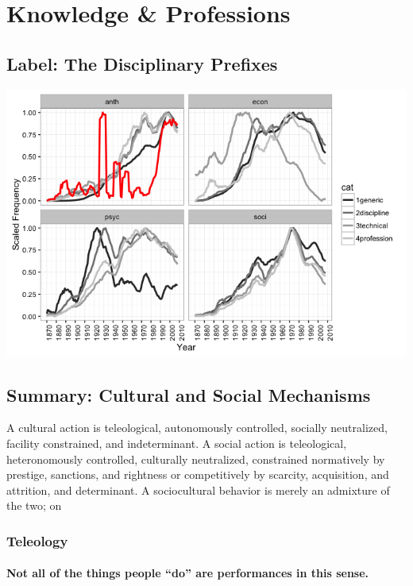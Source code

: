 \documentclass[]{article}
\begin{document}
\section{Knowledge \& Professions}\label{knowledge-professions}

\subsection{Label: The Disciplinary
Prefixes}\label{label-the-disciplinary-prefixes}

\begin{center}\includegraphics{Figs/ch0/disciplines-1} \end{center}

\subsection{Summary: Cultural and Social
Mechanisms}\label{summary-cultural-and-social-mechanisms}

A cultural action is teleological, autonomously controlled, socially
neutralized, facility constrained, and indeterminant. A social action is
teleological, heteronomously controlled, culturally neutralized,
constrained normatively by prestige, sanctions, and rightness or
competitively by scarcity, acquisition, and attrition, and determinant.
A sociocultural behavior is merely an admixture of the two; on

\subsubsection{Teleology}\label{teleology}

\paragraph{Not all of the things people ``do'' are performances in this
sense.}\label{not-all-of-the-things-people-do-are-performances-in-this-sense.}
\end{document}
